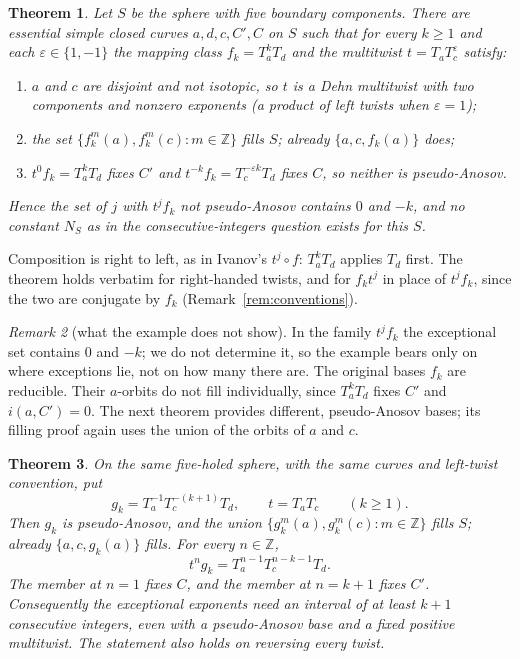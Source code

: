 \documentclass[11pt]{article}
\newtheorem{theorem}{Theorem}
\theoremstyle{remark}
\newtheorem{remark}[theorem]{Remark}
\newcommand{\Z}{\mathbb{Z}}
\begin{document}
\begin{theorem}\label{thm:main}
Let $S$ be the sphere with five boundary components. There are essential
simple closed curves $a,d,c,C',C$ on $S$ such that for every $k\ge1$ and
each $\varepsilon\in\{1,-1\}$ the mapping class $f_k=T_a^kT_d$ and the
multitwist $t=T_aT_c^{\varepsilon}$ satisfy:
\begin{enumerate}
\item $a$ and $c$ are disjoint and not isotopic, so $t$ is a Dehn multitwist
  with two components and nonzero exponents (a product of left twists when
  $\varepsilon=1$);
\item the set $\{f_k^m(a),f_k^m(c):m\in\Z\}$ fills $S$; already
  $\{a,c,f_k(a)\}$ does;
\item $t^0f_k=T_a^kT_d$ fixes $C'$ and $t^{-k}f_k=T_c^{-\varepsilon k}T_d$
  fixes $C$, so neither is pseudo-Anosov.
\end{enumerate}
Hence the set of $j$ with $t^jf_k$ not pseudo-Anosov contains $0$ and $-k$,
and no constant $N_S$ as in the consecutive-integers question exists for
this $S$.
\end{theorem}

Composition is right to left, as in Ivanov's $t^j\circ f$: $T_a^kT_d$ applies
$T_d$ first. The theorem holds verbatim for right-handed twists, and for
$f_kt^j$ in place of $t^jf_k$, since the two are conjugate by $f_k$
(Remark~\ref{rem:conventions}).

\begin{remark}[what the example does not show]
In the family $t^jf_k$ the exceptional set contains $0$ and $-k$; we do not
determine it, so the example bears only on where exceptions lie, not on how
many there are. The original bases $f_k$ are reducible. Their $a$-orbits do not fill
individually, since $T_a^kT_d$ fixes $C'$ and $i(a,C')=0$.
The next theorem provides different, pseudo-Anosov bases; its filling
proof again uses the union of the orbits of $a$ and $c$.
\end{remark}

\begin{theorem}\label{thm:pa}
On the same five-holed sphere, with the same curves and left-twist
convention, put
\[
 g_k=T_a^{-1}T_c^{-(k+1)}T_d,\qquad t=T_aT_c\qquad(k\ge1).
\]
Then $g_k$ is pseudo-Anosov, and the union
$\{g_k^m(a),g_k^m(c):m\in\Z\}$ fills $S$; already
$\{a,c,g_k(a)\}$ fills. For every $n\in\Z$,
\[
 t^ng_k=T_a^{n-1}T_c^{n-k-1}T_d.
\]
The member at $n=1$ fixes $C$, and the member at $n=k+1$ fixes $C'$.
Consequently the exceptional exponents need an interval of at least
$k+1$ consecutive integers, even with a pseudo-Anosov base and a fixed
positive multitwist. The statement also holds on reversing every twist.
\end{theorem}
\end{document}
